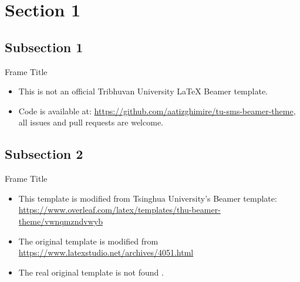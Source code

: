 \section{Section 1}

\subsection{Subsection 1}

\begin{frame}{Frame Title}
    \begin{itemize}[<+-| alert@+>] %
        \item This is not an official Tribhuvan University \LaTeX{} Beamer template. 
        \item Code is available at: \url{https://github.com/aatizghimire/tu-sms-beamer-theme}, all issues and pull requests are welcome.
    \end{itemize}
\end{frame}

\subsection{Subsection 2}

\begin{frame}{Frame Title}
    \begin{itemize}
        \item This template is modified from Tsinghua University's Beamer template: \url{https://www.overleaf.com/latex/templates/thu-beamer-theme/vwnqmzndvwyb} \pause
        \item The original template is modified from \newline \url{https://www.latexstudio.net/archives/4051.html}
        \item The real original template is not found \cite{origin}.
    \end{itemize}
\end{frame}
